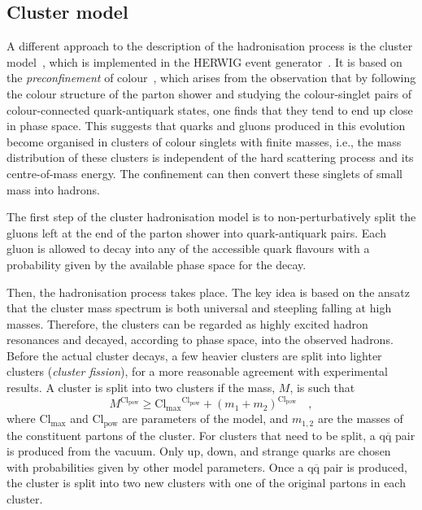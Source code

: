 \subsection{Cluster model}
A different approach to the description of the hadronisation process is the cluster model~\cite{Webber:1983if}, which is implemented in the HERWIG event generator~\cite{Bahr:2008pv}. It is based on the \emph{preconfinement} of colour~\cite{Amati:1979fg}, which arises from the observation that by following the colour structure of the parton shower and studying the colour-singlet pairs of colour-connected quark-antiquark states, one finds that they tend to end up close in phase space. This suggests that quarks and gluons produced in this evolution become organised in clusters of colour singlets with finite masses, i.e., the mass distribution of these clusters is independent of the hard scattering process and its centre-of-mass energy. The confinement can then convert these singlets of small mass into hadrons. 

The first step of the cluster hadronisation model is to non-perturbatively split the gluons left at the end of the parton shower into quark-antiquark pairs. Each gluon is allowed to decay into any of the accessible quark flavours with a probability given by the available phase space for the decay. 

Then, the hadronisation process takes place. The key idea is based on the ansatz that the cluster mass spectrum is both universal and steepling falling at high masses. Therefore, the clusters can be regarded as highly excited hadron resonances and decayed, according to phase space, into the observed hadrons. Before the actual cluster decays, a few heavier clusters are split into lighter clusters (\emph{cluster fission}), for a more reasonable agreement with experimental results. A cluster is split into two clusters if the mass, $M$, is such that
\begin{equation*}
    M^{\mathrm{Cl_{pow}}} \geq \mathrm{Cl_{max} {}^{Cl_{pow}}} + (m_1+m_2)^{\mathrm{Cl_{pow}}}\quad ,
\end{equation*}
where $\mathrm{Cl_{max}}$ and $\mathrm{Cl_{pow}}$ are parameters of the model, and $m_{1,2}$ are the masses of the constituent partons of the cluster. For clusters that need to be split, a $\mathrm{q\overline{q}}$ pair is produced from the vacuum. Only up, down, and strange quarks are chosen with probabilities given by other model parameters. Once a $\mathrm{q\overline{q}}$ pair is produced, the cluster is split into two new clusters with one of the original partons in each cluster. 

